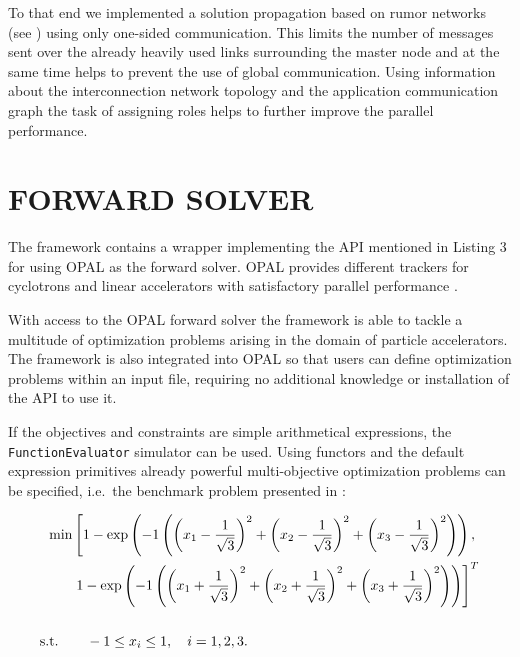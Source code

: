 \documentclass[%
reprint,
amsmath,amssymb,
aps,
prstab,
]{revtex4-1}
\begin{document}
To that end we implemented a solution propagation based on rumor networks 
(see \cite{bgps:06,ayss:09}) using only one-sided communication.
This limits the number of messages sent over the already heavily used links
  surrounding the master node and at the same time helps to prevent the use of
  global communication.
Using information about the interconnection network topology and the
  application communication graph the task of assigning roles helps to further
  improve the parallel performance.



\section{FORWARD SOLVER} \label{sec:forward-solver}

The framework contains a wrapper implementing the API mentioned in
  Listing 3 for using \textsc{OPAL} \cite{opal} as the forward solver.
\textsc{OPAL} provides different trackers for cyclotrons and linear
  accelerators with satisfactory parallel performance \cite{akir:09}.

With access to the \textsc{OPAL} forward solver the framework is able to
  tackle a multitude of optimization problems arising in the domain of
  particle accelerators.
  The framework is also integrated into \textsc{OPAL} so that users can 
  define optimization problems within an input file, requiring no 
  additional knowledge or installation of the API to use it.


If the objectives and constraints are simple arithmetical expressions, the
  \texttt{FunctionEvaluator} simulator can be used.
Using functors and the default expression primitives already powerful
  multi-objective optimization problems can be specified, i.e.\ the benchmark
  problem presented in \cite{hbwh:05}:
%

	\begin{widetext}
		\begin{align} \label{eqn:bench}
		\text{min} & \left[ 1 - \exp \left( -1 \left(
		\left(x_1 - \frac{1}{\sqrt{3}} \right)^2 +
		\left(x_2 - \frac{1}{\sqrt{3}} \right)^2 +
		\left(x_3 - \frac{1}{\sqrt{3}} \right)^2 \right)\right), \right. \\
		\vspace{3em} 
		& \left. 1 - \exp \left( -1 \left(
		\left(x_1 + \frac{1}{\sqrt{3}} \right)^2 +
		\left(x_2 + \frac{1}{\sqrt{3}} \right)^2 +
		\left(x_3 + \frac{1}{\sqrt{3}} \right)^2 \right)\right) \right]^T \nonumber \\
		\vspace{3em} \nonumber \\
		\text{s.t.} \quad & \quad -1 \le x_i \le 1, \quad i=1,2,3 \nonumber
		\text{.} \nonumber
		\end{align}
	\end{widetext}
\end{document}
